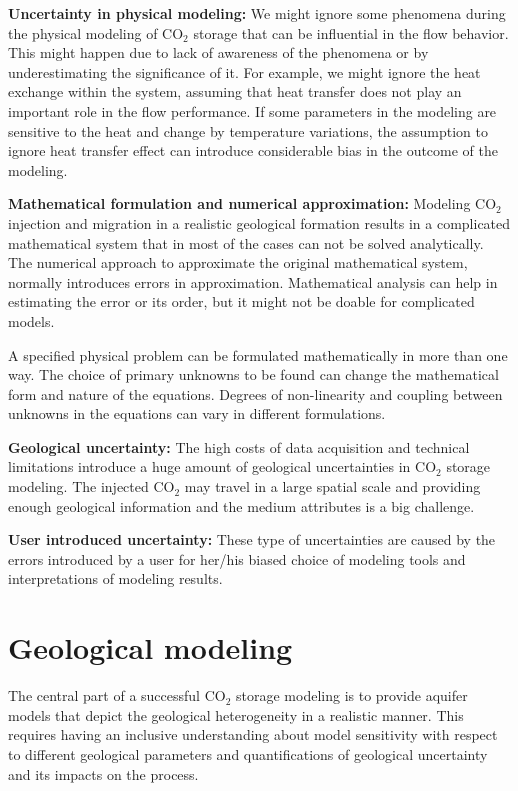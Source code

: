 \textbf{Uncertainty in physical modeling:} We might ignore some phenomena during
the physical modeling of $\mbox{CO}_2$ storage that can be influential in the
flow behavior. This might happen due to lack of awareness of the phenomena or by
underestimating the significance of it. For
example, we might ignore the heat exchange within the system, assuming that heat transfer does not play an important role in the flow performance. If some parameters in the modeling are sensitive to the heat and change by temperature variations, the assumption to ignore heat transfer effect can introduce considerable bias in the outcome of the modeling.

\textbf{Mathematical formulation and numerical approximation:} Modeling $\mbox{CO}_2$ injection and migration in a realistic geological
formation results in a complicated mathematical system that in most of the cases
can not be solved analytically. The numerical approach to approximate the
original mathematical system, normally introduces errors in approximation.
Mathematical analysis can help in estimating the error or its order, but it
might not be doable for complicated models.

A specified
physical problem can be formulated mathematically in more than one way. The
choice of primary unknowns to be found can change the mathematical form and
nature of the equations. Degrees of non-linearity and coupling between unknowns
in the equations can vary in different formulations. 



\textbf{Geological uncertainty:} The high costs of data acquisition and
technical
limitations introduce a huge amount of geological uncertainties in $\mbox{CO}_2$
storage modeling. The injected $\mbox{CO}_2$ may travel in a large spatial scale
and providing enough geological information and the medium attributes is a big
challenge.

\textbf{User introduced uncertainty:} These type of uncertainties are caused by
the errors introduced by a user for her/his biased choice of modeling tools and
interpretations of modeling results. 

\section{Geological modeling}
\label{sec:GeologicalModeling}

The central part of a successful $\mbox{CO}_2$ storage modeling is to
provide aquifer models that depict the geological heterogeneity in a
realistic manner. This requires having an inclusive understanding about model
sensitivity with respect to different geological parameters and quantifications
of geological uncertainty and its impacts on the process. 

